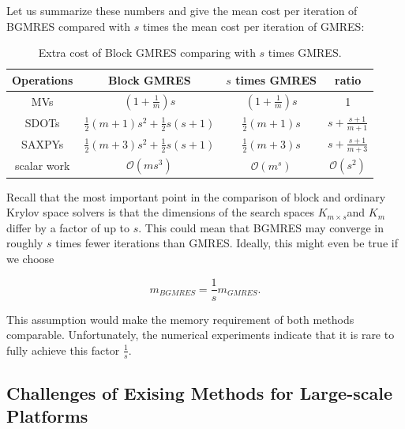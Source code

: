 Let us summarize these numbers and give the mean cost per iteration of BGMRES compared with $s$ times the mean cost per iteration of GMRES:

\begin{table}[htbp]
	\renewcommand{\arraystretch}{1.4}
	\small	
	\caption{Extra cost of Block GMRES comparing with $s$ times GMRES. \cite{gutknecht2006block}}
	\label{block-gmres}
	\centering
	\begin{tabular}{c|c|c|c}
		\toprule
		\cellcolor{gray!50}Operations & \cellcolor{gray!50}Block GMRES & \cellcolor{gray!50}$s$ times GMRES & \cellcolor{gray!50}ratio  \\
		\midrule
		MVs  & $(1+\frac{1}{m})s$ & $(1+\frac{1}{m})s$ & 1\\
		\cellcolor{gray!20}SDOTs & \cellcolor{gray!20}$\frac{1}{2}(m+1)s^2+\frac{1}{2}s(s+1)$ & \cellcolor{gray!20}$\frac{1}{2}(m+1)s$ & \cellcolor{gray!20}$s+\frac{s+1}{m+1}$   \\
		SAXPYs &  $\frac{1}{2}(m+3)s^2+\frac{1}{2}s(s+1)$ & $\frac{1}{2}(m+3)s$ & $s+\frac{s+1}{m+3}$ \\
		\cellcolor{gray!20}scalar work & \cellcolor{gray!20}$\mathcal{O}(ms^3)$ & \cellcolor{gray!20}$\mathcal{O}(m^s)$& \cellcolor{gray!20}$\mathcal{O}(s^2)$\\
		\bottomrule
	\end{tabular}
\end{table}

Recall that the most important point in the comparison of block and ordinary Krylov space solvers is that the dimensions of the search spaces $K_{m \times s}$and $K_m$ differ by a factor of up to $s$. This could mean that BGMRES may converge in roughly $s$ times fewer iterations than GMRES. Ideally, this might even be true if we choose

\begin{equation}
	m_{BGMRES} = \frac{1}{s}m_{GMRES}.
\end{equation}

This assumption would make the memory requirement of both methods comparable. Unfortunately, the numerical experiments indicate that it is rare to fully achieve this factor $\frac{1}{s}$.

\subsection{Challenges of Exising Methods for Large-scale Platforms}

